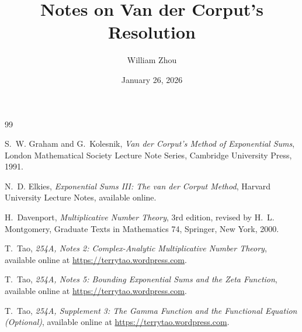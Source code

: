 \documentclass{article}
\title{\textbf{Notes on Van der Corput's Resolution}}
\author{William Zhou}
\date{January 26, 2026}
\begin{document}
\maketitle

\tableofcontents
\newpage





\begin{thebibliography}{99}

S.~W. Graham and G.~Kolesnik,
\emph{Van der Corput's Method of Exponential Sums},
London Mathematical Society Lecture Note Series,
Cambridge University Press, 1991.

N.~D. Elkies,
\emph{Exponential Sums III: The van der Corput Method},
Harvard University Lecture Notes,
available online.

H.~Davenport,
\emph{Multiplicative Number Theory},
3rd edition, revised by H.~L. Montgomery,
Graduate Texts in Mathematics 74,
Springer, New York, 2000.

T.~Tao,
\emph{254A, Notes 2: Complex-Analytic Multiplicative Number Theory},
available online at \url{https://terrytao.wordpress.com}.

T.~Tao,
\emph{254A, Notes 5: Bounding Exponential Sums and the Zeta Function},
available online at \url{https://terrytao.wordpress.com}.

T.~Tao,
\emph{254A, Supplement 3: The Gamma Function and the Functional Equation (Optional)},
available online at \url{https://terrytao.wordpress.com}.

\end{thebibliography}
\end{document}

